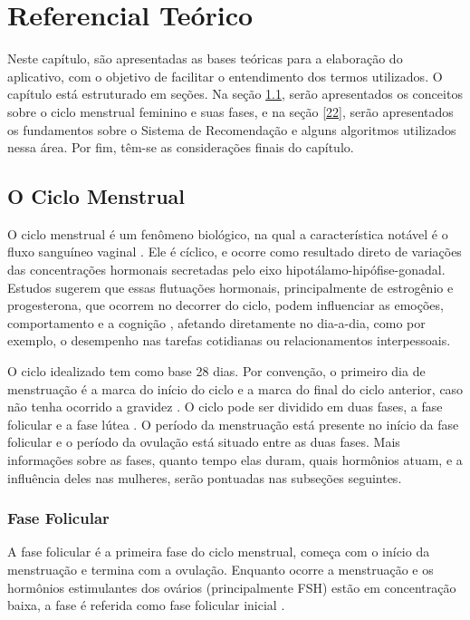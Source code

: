 \chapter[Referencial Teórico]{Referencial Teórico}
\label{ch:referencial}

Neste capítulo, são apresentadas as bases teóricas para a elaboração do 
aplicativo, com o objetivo de facilitar o entendimento dos termos utilizados. 
O capítulo está estruturado em seções. Na seção \ref{21}, serão apresentados os 
conceitos sobre o ciclo menstrual feminino e suas fases, e na seção \ref{22}, serão 
apresentados os fundamentos sobre o Sistema de Recomendação e alguns algoritmos 
utilizados nessa área. Por fim, têm-se as considerações finais do capítulo.

\section{O Ciclo Menstrual}
\label{21}

O ciclo menstrual é um fenômeno biológico, 
na qual a característica notável é o fluxo sanguíneo vaginal \cite{guyton2012}.
Ele é cíclico, e ocorre como resultado direto de variações das concentrações
hormonais secretadas pelo eixo hipotálamo-hipófise-gonadal. Estudos sugerem
que essas flutuações hormonais, principalmente de estrogênio e progesterona,
que ocorrem no decorrer do ciclo, podem influenciar as emoções,
comportamento e a cognição \cite{poroma2014}, afetando
diretamente no dia-a-dia, como por exemplo, o desempenho nas tarefas
cotidianas ou relacionamentos interpessoais.


O ciclo idealizado tem como base 28 dias. Por convenção, o primeiro dia de
menstruação é a marca do início do ciclo e a marca do final do ciclo
anterior, caso não tenha ocorrido a gravidez \cite{lenton1984a}. O ciclo
pode ser dividido em duas fases, a fase folicular e a fase lútea
\cite{brondin2008}. O período da menstruação está presente no início da
fase folicular e o período da ovulação está situado entre as duas fases.
Mais informações sobre as fases, quanto tempo elas duram, quais hormônios
atuam, e a influência deles nas mulheres, serão pontuadas nas subseções
seguintes.


\subsection{Fase Folicular}

A fase folicular é a primeira fase do ciclo menstrual, começa com o início
da menstruação e termina com a ovulação. Enquanto ocorre a menstruação e os
hormônios estimulantes dos ovários (principalmente FSH) estão em concentração
baixa, a fase é referida como fase folicular inicial \cite{lenton1984a}.


